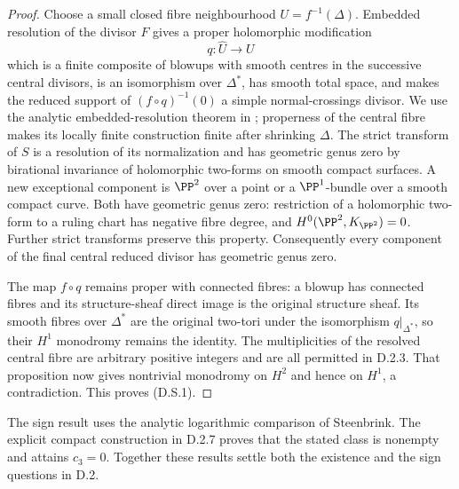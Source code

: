 \begin{proof}
Choose a small closed fibre neighbourhood $U=f^{-1}(\Delta)$.
Embedded resolution of the divisor $F$ gives a proper
holomorphic modification
\[
 q:\widehat U\longrightarrow U
\]
which is a finite composite of blowups with smooth centres in
the successive central divisors, is an isomorphism over
$\Delta^*$, has smooth total space, and makes the reduced
support of $(f\circ q)^{-1}(0)$ a simple normal-crossings
divisor. We use the analytic embedded-resolution theorem in
\cite[Theorem~1.6]{BierstoneMilman1997}; properness of the
central fibre makes its locally finite construction finite
after shrinking $\Delta$. The strict transform of $S$ is a
resolution of its normalization and has geometric genus zero
by birational invariance of holomorphic two-forms on smooth
compact surfaces. A new exceptional component is $\PP^2$ over
a point or a $\PP^1$-bundle over a smooth compact curve.
Both have geometric genus zero: restriction of a holomorphic
two-form to a ruling chart has negative fibre degree, and
$H^0(\PP^2,K_{\PP^2})=0$. Further strict transforms preserve
this property. Consequently every component of the final
central reduced divisor has geometric genus zero.

The map $f\circ q$ remains proper with connected fibres:
a blowup has connected fibres and its structure-sheaf direct
image is the original structure sheaf. Its smooth fibres over
$\Delta^*$ are the original two-tori under the isomorphism
$q|_{\Delta^*}$, so their $H^1$ monodromy remains the identity.
The multiplicities of the resolved central fibre are arbitrary
positive integers and are all permitted in D.2.3. That
proposition now gives nontrivial monodromy on $H^2$ and hence
on $H^1$, a contradiction. This proves (D.S.1).
\end{proof}

The sign result uses the analytic logarithmic comparison of
Steenbrink. The explicit compact construction in D.2.7 proves
that the stated class is nonempty and attains $c_3=0$.
Together these results settle both the existence and the sign
questions in D.2.



